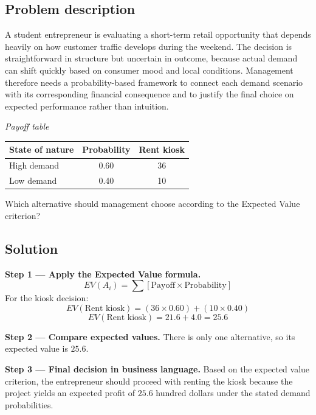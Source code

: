 

	
	\begin{ExamProblems}
		\item
		\subsection*{Problem description}
		A student entrepreneur is evaluating a short-term retail opportunity that depends heavily on how customer traffic develops during the weekend. The decision is straightforward in structure but uncertain in outcome, because actual demand can shift quickly based on consumer mood and local conditions. Management therefore needs a probability-based framework to connect each demand scenario with its corresponding financial consequence and to justify the final choice on expected performance rather than intuition.

		\begin{center}
			\textit{Payoff table} \par
			\begin{tabular}{l c c}
				\toprule
				State of nature & Probability & Rent kiosk \\
				\midrule
				High demand & 0.60 & 36 \\
				Low demand & 0.40 & 10 \\
				\bottomrule
			\end{tabular}
		\end{center}

		Which alternative should management choose according to the Expected Value criterion?

		\subsection*{Solution}
		\textbf{Step 1 --- Apply the Expected Value formula.}
		\[
		EV(A_i)=\sum [\text{Payoff}\times\text{Probability}]
		\]
		For the kiosk decision:
		\[
		EV(\text{Rent kiosk})=(36\times0.60)+(10\times0.40)
		\]
		\[
		EV(\text{Rent kiosk})=21.6+4.0=25.6
		\]
		
		\textbf{Step 2 --- Compare expected values.}
		There is only one alternative, so its expected value is $25.6$.
		
		\textbf{Step 3 --- Final decision in business language.}
		Based on the expected value criterion, the entrepreneur should proceed with renting the kiosk because the project yields an expected profit of $25.6$ hundred dollars under the stated demand probabilities.		\item

\end{ExamProblems}
